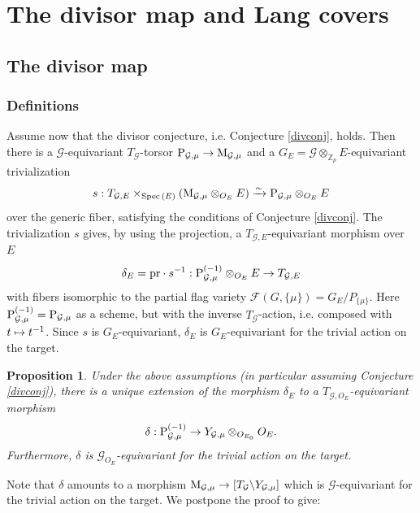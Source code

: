 \documentclass[reqno, 10pt]{amsart}
\makeatletter
\newcommand{\BZ}{\ensuremath{\mathbb {Z}}\xspace}
\newcommand{\CF}{\ensuremath{\mathcal {F}}\xspace}
\newcommand{\CG}{\ensuremath{\mathcal {G}}\xspace}
\DeclareMathOperator{\Spec}{Spec\,}
\newtheorem{proposition}[subsubsection]{Proposition}
\theoremstyle{definition}
\numberwithin{equation}{subsection}
\numberwithin{subsubsection}{subsection}
\renewcommand{\to}{%
   \ifbool{@display}{\longrightarrow}{\rightarrow}%
   }
\let\shortmapsto\mapsto
\renewcommand{\mapsto}{%
   \ifbool{@display}{\shortmapsto}{\shortmapsto}%
   }
\newcommand{\Mloc}{{\rm M}}
\newcommand{\bslash}{\symbol{92}}
\makeatother
\begin{document}
 




  \section{The divisor map and Lang covers}
 

\subsection{The divisor map}\label{ss:divm}

 
\subsubsection{Definitions} 
Assume now that the divisor conjecture, i.e. Conjecture \ref{divconj}, holds. Then there is a $\CG $-equivariant $T_{\CG }$-torsor ${\rm P}_{\CG,\mu}\to \Mloc_{\CG,\mu}$ and 
 a $G_E=\CG\otimes_{\BZ_p}E$-equivariant  trivialization 
\[
s: T_{\CG,E}\times_{\Spec(E)} (\Mloc_{\CG,\mu}\otimes_{O_E}E)\xrightarrow{\sim} {\rm P}_{\CG,\mu}
\otimes_{O_E}E
\]
 over the generic fiber,  satisfying the conditions of Conjecture \ref{divconj}. The trivialization $s$ gives, by using the projection, a $T_{\CG,E}$-equivariant morphism over $E$
\begin{equation}\label{defq}
\delta_E={\rm pr}\cdot s^{-1}: {\rm P}_{\CG,\mu}^{(-1)}
\otimes_{O_E}E
\to T_{\CG,E} 
\end{equation}
 with fibers isomorphic to the partial flag variety $\CF(G, \{\mu\})=G_E/P_{\{\mu\}}$. Here  ${\rm P}^{(-1)}_{\CG,\mu}={\rm P}_{\CG,\mu}$ as a scheme, but with the inverse $T_{\CG}$-action, i.e. composed with $t\mapsto t^{-1}$. Since $s$ is $G_E $-equivariant, $\delta_E$ is $G_E$-equivariant for the trivial action on the target. 
 
 \begin{proposition}\label{prop:delta}
Under the above assumptions (in particular assuming Conjecture \ref{divconj}), there is a unique extension of the morphism $\delta_E$  to a $T_{\CG,O_E}$-equivariant morphism  
\[
\delta: {\rm P}^{(-1)}_{\CG,\mu}\to Y_{\CG,\mu}\otimes_{O_{E_0}} O_E.
\]
Furthermore, $ \delta$ is $\CG_{O_E}$-equivariant for the trivial action on the target. 
\end{proposition} 

 Note that   $ \delta$ amounts to a morphism $\Mloc_{\CG,\mu}\to [T_\CG \bslash Y_{\CG,\mu}]$ which is $\CG $-equivariant for the trivial action on the target. We postpone the proof to give:
 
\end{document}
